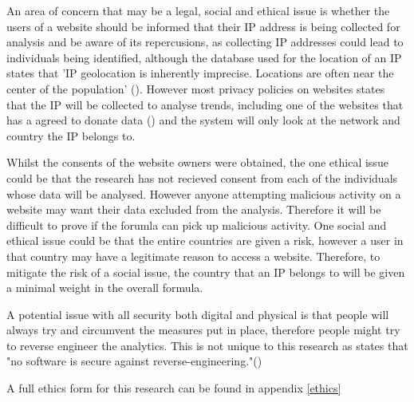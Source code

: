 
An area of concern that may be a legal, social and ethical issue is whether the users of a website should be informed that their IP address is being collected for analysis and be aware of its repercusions, as collecting IP addresses could lead to individuals being identified, although the database used for the location of an IP states that 'IP geolocation is inherently imprecise. Locations are often near the center of the population' (\cite{maxEthics}). However most privacy policies on websites states that the IP will be collected to analyse trends, including one of the websites that has a agreed to donate data (\cite{PetersWebPrivacy}) and the system will only look at the network and country the IP belongs to.


Whilst the  consents of the website owners were obtained, the one ethical issue could be that the research has not recieved consent from each of the individuals whose data will be analysed. However anyone attempting malicious activity on a website may want their data excluded from the analysis. Therefore it will be difficult to prove if the forumla can pick up malicious activity. One social and ethical issue could be that the entire countries are given a risk, however a user in that country may have a legitimate reason to access a website. Therefore, to mitigate the risk of a social issue, the country that an IP belongs to will be given a minimal weight in the overall formula. 

A potential issue with all security both digital and physical is that people will always try and circumvent the measures put in place, therefore people might try to reverse engineer the analytics. This is not unique to this research as \citeauthor{708447} states that "no software is secure against reverse-engineering."(\cite{708447})

A full ethics form for this research can be found in appendix \ref{ethics}

